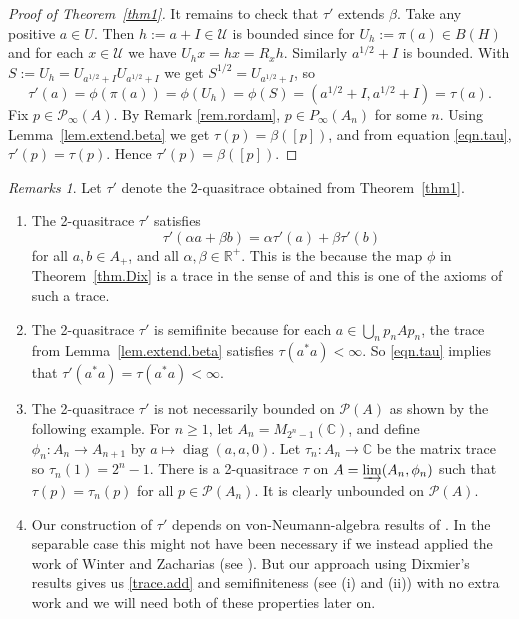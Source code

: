 \documentclass[a4paper, 12pt]{amsart}
\numberwithin{equation}{section}
\newcounter{theorem}
\theoremstyle{remark}
\newtheorem{remarks}[theorem]{Remarks}
\theoremstyle{definition}
\begin{document}
\begin{proof}[Proof of Theorem~\ref{thm1}]
It remains to check that $\tau'$ extends $\beta$. Take any positive $a\in U$. Then
$h:=a+I\in{\mathcal{U}}$ is bounded since for $U_h:=\pi(a)\in B(H)$ and for each $x\in {\mathcal{U}}$ we have
$U_hx=hx=R_xh$. Similarly $a^{1/2}+I$ is bounded. With
$S:=U_h=U_{a^{1/2}+I}U_{a^{1/2}+I}$ we get $S^{1/2}=U_{a^{1/2}+I}$, so
\begin{equation}\label{eqn.tau}
\tau'(a)=\phi(\pi(a))=\phi(U_h)=\phi(S)=(a^{1/2}+I,a^{1/2}+I)=\tau(a).
\end{equation}
Fix $p\in {\mathcal{P}}_\infty(A)$.  By Remark \ref{rem.rordam}, $p\in P_\infty(A_n)$ for some $n$.
Using  Lemma~\ref{lem.extend.beta} we get $\tau(p)=\beta([p])$, and from equation
\eqref{eqn.tau}, $\tau'(p)=\tau(p)$. Hence $\tau'(p)=\beta([p])$.
\end{proof}

\begin{remarks}\label{remark.thma}
Let $\tau'$ denote the 2-quasitrace obtained from Theorem~\ref{thm1}.
\begin{enumerate}
\item\label{remark.thma.i} The 2-quasitrace $\tau'$ satisfies
\begin{equation}\label{trace.add}
\tau'(\alpha a + \beta b) = \alpha \tau'(a) + \beta \tau'(b)
\end{equation}
for all $a,b\in A_+$, and all $\alpha,\beta \in {\mathbb{R}}^+$. This is the because the map
$\phi$ in Theorem~\ref{thm.Dix} is a trace in the sense of \cite{MR641217} and this is
one of the axioms of such a trace.

\item\label{remark.thma.ii} The 2-quasitrace  $\tau'$ is semifinite because for each $a\in\bigcup_np_nAp_n$, the
trace from Lemma~\ref{lem.extend.beta} satisfies $\tau(a^*a)< \infty$. So \eqref{eqn.tau}
implies that $\tau'(a^*a)=\tau(a^*a)< \infty$.

\item\label{remark.thma.iii} The 2-quasitrace  $\tau'$ is not necessarily bounded on ${\mathcal{P}}(A)$ as shown by the
following example. For $n\geq 1$, let $A_n=M_{2^n-1}({\mathbb{C}})$, and define $\phi_n\colon A_n\to A_{n+1}$ by $a\mapsto {\operatorname{diag}}(a,a,0)$. Let $\tau_n\colon A_n \to {\mathbb{C}}$ be the matrix trace so $\tau_n(1)=2^n-1$. There is a 2-quasitrace $\tau$ on $A=\varinjlim(A_n,\phi_n)$ such that $\tau(p)=\tau_n(p)$ for all $p\in {\mathcal{P}}(A_n)$. It is clearly unbounded on ${\mathcal{P}}(A)$.

\item\label{remark.thma.iv} Our construction of $\tau'$ depends on von-Neumann-algebra results of
\cite{MR641217}. In the separable case this might not have been necessary if we instead applied the work of
Winter and Zacharias (see \cite[Corollary 5.2]{MR2609012}). But our approach using
Dixmier's results gives us \eqref{trace.add} and semifiniteness (see (i) and (ii)) with
no extra work and we will need both of these properties later on.
\end{enumerate}
\end{remarks}
\end{document}
